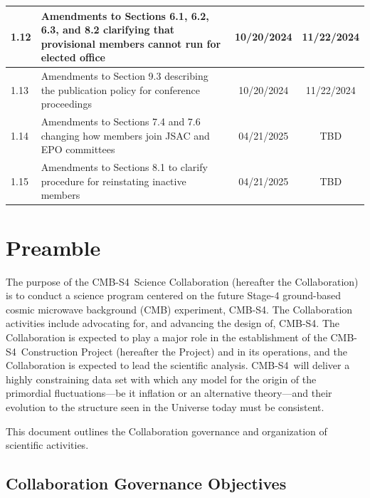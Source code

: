 \documentclass[12pt]{article}
\newcommand{\Comment}[1]{\textcolor{Blue}{(Comment: #1)}}
\newcommand\collabname{CMB-S4}
\begin{document}
\begin{longtable}{| l | p{3.7in} | c | c |}
1.12 & Amendments to Sections 6.1, 6.2, 6.3, and 8.2 clarifying that provisional members cannot run for elected office & 10/20/2024 & 11/22/2024 \label{tab:version} \\ \hline
1.13 & Amendments to Section 9.3 describing the publication policy for conference proceedings & 10/20/2024 & 11/22/2024 \label{tab:version} \\ \hline
1.14 & Amendments to Sections 7.4 and 7.6 changing how members join JSAC and EPO committees & 04/21/2025 & TBD \label{tab:version} \\ \hline
1.15 & Amendments to Sections 8.1 to clarify procedure for reinstating inactive members & 04/21/2025 & TBD \label{tab:version} \\ \hline
\end{longtable}



\newpage

\tableofcontents


\newpage

\section{Preamble}

The purpose of the \collabname\ Science Collaboration (hereafter the Collaboration) is to conduct a science program centered on the future Stage-4 ground-based cosmic microwave background (CMB) experiment, \collabname. The Collaboration activities include advocating for, and advancing the design of, \collabname. The Collaboration is expected to play a major role in the establishment of the \collabname\ Construction Project (hereafter the Project) and in its operations, and the Collaboration is expected to lead the scientific analysis. \collabname\ will deliver a highly constraining data set with which any model for the origin of the primordial fluctuations---be it inflation or an alternative theory---and their evolution to the structure seen in the Universe today must be consistent.

This document outlines the Collaboration governance and organization of scientific activities.

\subsection{Collaboration Governance Objectives}
\end{document}
